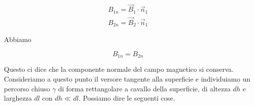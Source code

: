 \begin{gather*}
	B_{1n} = \vec{B}_1\cdot \vec{n}_1 \\
	B_{2n} = \vec{B}_2\cdot \vec{n}_1
\end{gather*}

Abbiamo

\[
	\boxed{B_{1n} = B_{2n}}
\]

Questo ci dice che la componente normale del campo magnetico si conserva.
Consideriamo a questo punto il versore tangente alla superficie e individuiamo un percorso chiuso $\gamma$ di forma rettangolare a cavallo della superficie, di altezza $dh$ e larghezza $dl$ con $ dh \ll dl $. Possiamo dire le seguenti cose.

\begin{figure}[htpb]
	\centering


	\begin{tikzpicture}[x=0.75pt,y=0.75pt,yscale=-1,xscale=1]


\end{tikzpicture}
\end{figure}

